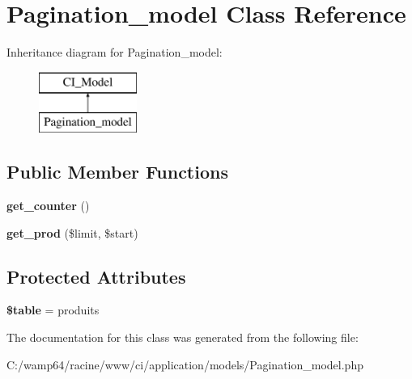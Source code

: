 \hypertarget{class_pagination__model}{}\section{Pagination\+\_\+model Class Reference}
\label{class_pagination__model}
Inheritance diagram for Pagination\+\_\+model\+:\begin{figure}[H]
\begin{center}
\leavevmode
\includegraphics[height=2.000000cm]{class_pagination__model}
\end{center}
\end{figure}
\subsection*{Public Member Functions}
\begin{DoxyCompactItemize}
\item 
\mbox{\label{class_pagination__model_a3ff403fa40515d0b5ac5124738fc3c79}} 
{\bfseries get\+\_\+counter} ()
\item 
\mbox{\label{class_pagination__model_a5900b37d1e9fd30ccea13a2382362d5a}} 
{\bfseries get\+\_\+prod} (\$limit, \$start)
\end{DoxyCompactItemize}
\subsection*{Protected Attributes}
\begin{DoxyCompactItemize}
\item 
\mbox{\label{class_pagination__model_a7c1de66e58d40fdfd37b71323a6fce74}} 
{\bfseries \$table} = \textquotesingle{}produits\textquotesingle{}
\end{DoxyCompactItemize}


The documentation for this class was generated from the following file\+:\begin{DoxyCompactItemize}
\item 
C\+:/wamp64/racine/www/ci/application/models/Pagination\+\_\+model.\+php\end{DoxyCompactItemize}
